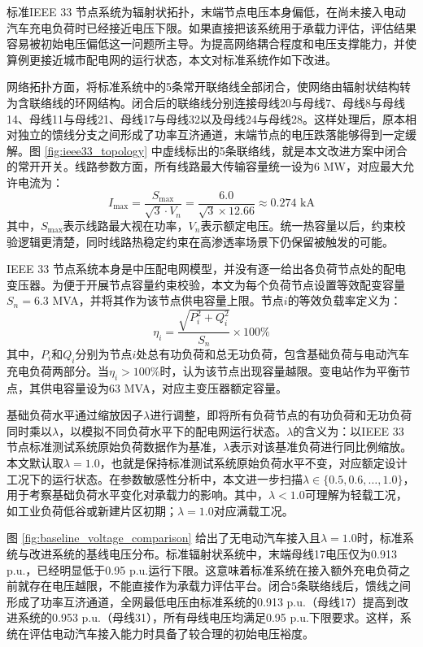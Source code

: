 \documentclass[10pt,a4paper]{article}
\numberwithin{equation}{section}
\numberwithin{table}{section}
\numberwithin{figure}{section}
\begin{document}
    标准IEEE 33 节点系统为辐射状拓扑，末端节点电压本身偏低，在尚未接入电动汽车充电负荷时已经接近电压下限。如果直接把该系统用于承载力评估，评估结果容易被初始电压偏低这一问题所主导。为提高网络耦合程度和电压支撑能力，并使算例更接近城市配电网的运行状态，本文对标准系统作如下改进。

    网络拓扑方面，将标准系统中的5条常开联络线全部闭合，使网络由辐射状结构转为含联络线的环网结构。闭合后的联络线分别连接母线20与母线7、母线8与母线14、母线11与母线21、母线17与母线32以及母线24与母线28。这样处理后，原本相对独立的馈线分支之间形成了功率互济通道，末端节点的电压跌落能够得到一定缓解。图 \ref{fig:ieee33_topology} 中虚线标出的5条联络线，就是本文改进方案中闭合的常开开关。线路参数方面，所有线路最大传输容量统一设为6 MW，对应最大允许电流为：
    \begin{equation}
    \label{eq:line_current_limit}
    I_{\max} = \frac{S_{\max}}{\sqrt{3} \cdot V_n} = \frac{6.0}{\sqrt{3} \times 12.66} \approx 0.274 \text{ kA}
    \end{equation}
    其中，$S_{\max}$表示线路最大视在功率，$V_n$表示额定电压。统一热容量以后，约束校验逻辑更清楚，同时线路热稳定约束在高渗透率场景下仍保留被触发的可能。

    IEEE 33 节点系统本身是中压配电网模型，并没有逐一给出各负荷节点处的配电变压器。为便于开展节点容量约束校验，本文为每个负荷节点设置等效配变容量$S_{n} = 6.3$ MVA，并将其作为该节点供电容量上限。节点$i$的等效负载率定义为：
    \begin{equation}
    \label{eq:transformer_loading}
    \eta_i = \frac{\sqrt{P_i^2 + Q_i^2}}{S_{n}} \times 100\%
    \end{equation}
    其中，$P_i$和$Q_i$分别为节点$i$处总有功负荷和总无功负荷，包含基础负荷与电动汽车充电负荷两部分。当$\eta_i > 100\%$时，认为该节点出现容量越限。变电站作为平衡节点，其供电容量设为63 MVA，对应主变压器额定容量。

    基础负荷水平通过缩放因子$\lambda$进行调整，即将所有负荷节点的有功负荷和无功负荷同时乘以$\lambda$，以模拟不同负荷水平下的配电网运行状态。$\lambda$的含义为：以IEEE 33 节点标准测试系统原始负荷数据\supercite{ref22}作为基准，$\lambda$表示对该基准负荷进行同比例缩放。本文默认取$\lambda = 1.0$，也就是保持标准测试系统原始负荷水平不变，对应额定设计工况下的运行状态。在参数敏感性分析中，本文进一步扫描$\lambda \in \{0.5, 0.6, \ldots, 1.0\}$，用于考察基础负荷水平变化对承载力的影响。其中，$\lambda < 1.0$可理解为轻载工况，如工业负荷低谷或新建片区初期；$\lambda = 1.0$对应满载工况。

    图 \ref{fig:baseline_voltage_comparison} 给出了无电动汽车接入且$\lambda = 1.0$时，标准系统与改进系统的基线电压分布。标准辐射状系统中，末端母线17电压仅为0.913 p.u.，已经明显低于0.95 p.u.运行下限。这意味着标准系统在接入额外充电负荷之前就存在电压越限，不能直接作为承载力评估平台。闭合5条联络线后，馈线之间形成了功率互济通道，全网最低电压由标准系统的0.913 p.u.（母线17）提高到改进系统的0.953 p.u.（母线31），所有母线电压均满足0.95 p.u.下限要求。这样，系统在评估电动汽车接入能力时具备了较合理的初始电压裕度。
\end{document}

